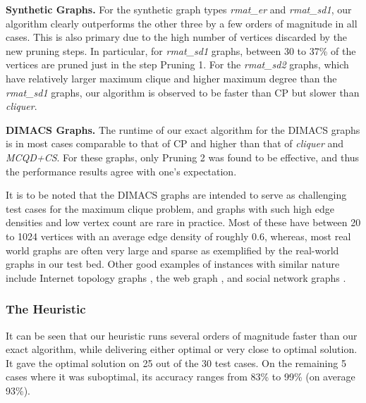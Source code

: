 {\bf Synthetic Graphs. }
For the synthetic graph types {\it rmat\_er} and {\it rmat\_sd1}, our algorithm clearly outperforms 
the other three by a few orders of magnitude in all cases. 
This is also primary due to the high number of vertices discarded by the new pruning steps. 
In particular, for {\it rmat\_sd1} graphs, between 30 to 37\% of the vertices are pruned just in the step Pruning 1. 
For the {\it rmat\_sd2} graphs, which have relatively larger maximum clique and higher maximum degree than the {\it rmat\_sd1} graphs, our algorithm is observed to be faster than 
CP but slower than {\em cliquer}. 

{\bf DIMACS Graphs. }
The runtime of our exact algorithm for the DIMACS graphs is 
in most cases comparable to that of CP and higher than that of {\it cliquer}
and {\it MCQD+CS}.
For these graphs, only Pruning 2 was found to be effective, 
and thus the performance results agree with one's expectation. 



It is to be noted that the DIMACS graphs are intended to serve as challenging test cases for the maximum clique problem, and graphs with such high edge densities and low vertex count are rare in practice. 
Most of these have between 20 to 1024 vertices with an average edge density of roughly 0.6, 
whereas, most real world graphs are often very large and sparse
as exemplified by the real-world graphs in our test bed.
Other good examples of instances with similar nature include Internet topology graphs \cite{Faloutsos:1999:PRI:316188.316229}, the web graph \cite{kumar:extracting}, and social network graphs \cite{Domingos:2001:MNV:502512.502525}.


\subsubsection{The Heuristic}
\label{sec:exp-heuristic}

It can be seen that our heuristic runs several orders of magnitude faster than our exact algorithm,
while delivering either optimal or very close to optimal solution.
It gave the optimal solution on 25 out of the 30 test cases.
On the remaining 5 cases where it was suboptimal, its accuracy ranges from 83\% to 99\% (on average 93\%).

